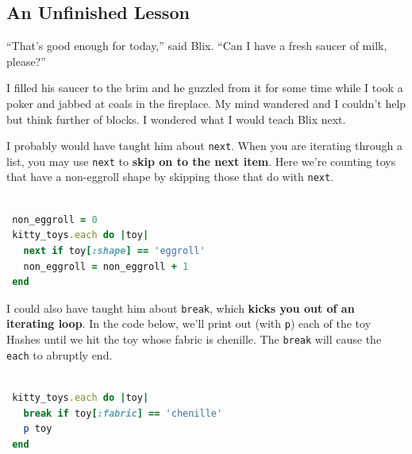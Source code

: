 \documentclass[10pt,twoside]{report}
\begin{document}
\subsection{ An Unfinished Lesson}



``That's good enough for today,'' said Blix.  ``Can I have a fresh
saucer of milk, please?''

I filled his saucer to the brim and he guzzled from it for some time
while I took a poker and jabbed at coals in the fireplace.  My mind
wandered and I couldn't help but think further of blocks.  I wondered
what I would teach Blix next.

I probably would have taught him about
\lstinline[breaklines=true]|next|.  When you are iterating through a
list, you may use \lstinline[breaklines=true]|next| to {\bf skip on to
  the next item}.  Here we're counting toys that have a non-eggroll
shape by skipping those that do with
\lstinline[breaklines=true]|next|.


\begin{lstlisting}[basicstyle=\ttfamily\color{basiccolor},
    commentstyle = \ttfamily\color{commentcolor},
    keywordstyle=\ttfamily\color{keywordscolor},
    stringstyle=\color{stringcolor},
    language=Ruby,
    basicstyle=\small\ttfamily,
    showstringspaces=false,
  ]

 non_eggroll = 0
 kitty_toys.each do |toy|
   next if toy[:shape] == 'eggroll'
   non_eggroll = non_eggroll + 1
 end

\end{lstlisting}

I could also have taught him about \lstinline[breaklines=true]|break|,
which {\bf kicks you out of an iterating loop}. In the code below,
we'll print out (with \lstinline[breaklines=true]|p|) each of the toy
Hashes until we hit the toy whose fabric is chenille.  The
\lstinline[breaklines=true]|break| will cause the
\lstinline[breaklines=true]|each| to abruptly end.


\begin{lstlisting}[basicstyle=\ttfamily\color{basiccolor},
    commentstyle = \ttfamily\color{commentcolor},
    keywordstyle=\ttfamily\color{keywordscolor},
    stringstyle=\color{stringcolor},
    language=Ruby,
    basicstyle=\small\ttfamily,
    showstringspaces=false,
  ]

 kitty_toys.each do |toy|
   break if toy[:fabric] == 'chenille'
   p toy
 end

\end{lstlisting}
\end{document}
